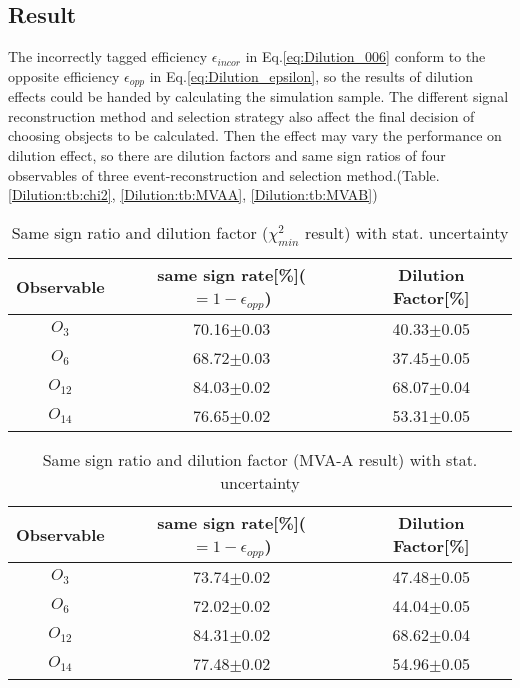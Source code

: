 	\subsection{Result}
	\label{Dilution:result}
		
		The incorrectly tagged efficiency $\epsilon_{incor}$ in Eq.\ref{eq:Dilution_006} conform to the opposite efficiency $\epsilon_{opp}$ in Eq.\ref{eq:Dilution_epsilon}, so the results of dilution effects could be handed by calculating the simulation sample. The different signal reconstruction method and selection strategy also affect the final decision of choosing obsjects to be calculated. Then the effect may vary the performance on dilution effect, so there are dilution factors and same sign ratios of four observables of three event-reconstruction and selection method.(Table. \ref{Dilution:tb:chi2}, \ref{Dilution:tb:MVAA}, \ref{Dilution:tb:MVAB})

		\begin{center}
		\setlength{\tabcolsep}{12pt}
		\begin{longtable}{ c | c c }
		\caption{Same sign ratio and dilution factor ($\chi^2_{min}$ result) with stat. uncertainty}\\
		Observable & same sign rate[\%]($=1-\epsilon_{opp}$) & Dilution Factor[\%] \\
		\hline
		$O_{3}$ & 70.16$\pm$0.03  &  40.33$\pm$0.05  \\
		$O_{6}$ &  68.72$\pm$0.03  &  37.45$\pm$0.05  \\
		$O_{12}$ &  84.03$\pm$0.02  &  68.07$\pm$0.04  \\
		$O_{14}$ &  76.65$\pm$0.02  &  53.31$\pm$0.05  \\
		\hline
		\end{longtable}
		\label{Dilution:tb:chi2}
		\end{center}

		\begin{center}
		\setlength{\tabcolsep}{12pt}
		\begin{longtable}{ c | c c }
		\caption{Same sign ratio and dilution factor (MVA-A result) with stat. uncertainty}\\
		Observable & same sign rate[\%]($=1-\epsilon_{opp}$) & Dilution Factor[\%] \\
		\hline
		$O_{3}$ & 73.74$\pm$0.02  &  47.48$\pm$0.05  \\
		$O_{6}$ &  72.02$\pm$0.02  &  44.04$\pm$0.05  \\
		$O_{12}$ &  84.31$\pm$0.02  &  68.62$\pm$0.04  \\
		$O_{14}$ &  77.48$\pm$0.02  &  54.96$\pm$0.05  \\
		\hline
		\end{longtable}
		\label{Dilution:tb:MVAA}
		\end{center}

